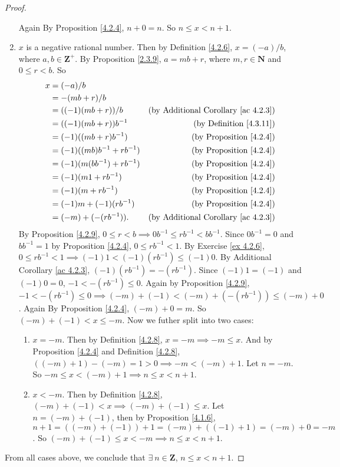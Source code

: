 \begin{proof}
\begin{enumerate}
    Again By Proposition \ref{4.2.4}, \(n + 0 = n\).
    So \(n \leq x < n + 1\).
    \item \(x\) is a negative rational number.
    Then by Definition \ref{4.2.6}, \(x = (-a) / b\), where \(a, b \in \mathbf{Z}^+\).
    By Proposition \ref{2.3.9}, \(a = mb + r\), where \(m, r \in \mathbf{N}\) and \(0 \leq r < b\).
    So
    \begin{align*}
    x &= (-a) / b \\
    &= -(mb + r) / b \\
    &= ((-1)(mb + r)) / b & \text{(by Additional Corollary \ref{ac 4.2.3})} \\
    &= ((-1)(mb + r))b^{-1} & \text{(by Definition \ref{4.3.11})} \\
    &= (-1)((mb + r)b^{-1}) & \text{(by Proposition \ref{4.2.4})} \\
    &= (-1)((mb)b^{-1} + rb^{-1}) & \text{(by Proposition \ref{4.2.4})} \\
    &= (-1)(m(bb^{-1}) + rb^{-1}) & \text{(by Proposition \ref{4.2.4})} \\
    &= (-1)(m1 + rb^{-1}) & \text{(by Proposition \ref{4.2.4})} \\
    &= (-1)(m + rb^{-1}) & \text{(by Proposition \ref{4.2.4})} \\
    &= (-1)m + (-1)(rb^{-1}) & \text{(by Proposition \ref{4.2.4})} \\
    &= (-m) + (-(rb^{-1})). & \text{(by Additional Corollary \ref{ac 4.2.3})} \\
    \end{align*}
    By Proposition \ref{4.2.9}, \(0 \leq r < b \implies 0b^{-1} \leq rb^{-1} < bb^{-1}\).
    Since \(0b^{-1} = 0\) and \(bb^{-1} = 1\) by Proposition \ref{4.2.4}, \(0 \leq rb^{-1} < 1\).
    By Exercise \ref{ex 4.2.6}, \(0 \leq rb^{-1} < 1 \implies (-1)1 < (-1)(rb^{-1}) \leq (-1)0\).
    By Additional Corollary \ref{ac 4.2.3}, \((-1)(rb^{-1}) = -(rb^{-1})\).
    Since \((-1)1 = (-1)\) and \((-1)0 = 0\), \(-1 < -(rb^{-1}) \leq 0\).
    Again by Proposition \ref{4.2.9}, \(-1 < -(rb^{-1}) \leq 0 \implies (-m) + (-1) < (-m) + (-(rb^{-1})) \leq (-m) + 0\).
    Again By Proposition \ref{4.2.4}, \((-m) + 0 = m\).
    So \((-m) + (-1) < x \leq -m\).
    Now we futher split into two cases:
    \begin{enumerate}[label=(\roman*)]
        \item \(x = -m\).
        Then by Definition \ref{4.2.8}, \(x = -m \implies -m \leq x\).
        And by Proposition \ref{4.2.4} and Definition \ref{4.2.8}, \(((-m) + 1) - (-m) = 1 > 0 \implies -m < (-m) + 1\).
        Let \(n = -m\).
        So \(-m \leq x < (-m) + 1 \implies n \leq x < n + 1\).
        \item \(x < -m\).
        Then by Definition \ref{4.2.8}, \((-m) + (-1) < x \implies (-m) + (-1) \leq x\).
        Let \(n = (-m) + (-1)\), then by Proposition \ref{4.1.6}, \(n + 1 = ((-m) + (-1)) + 1 = (-m) + ((-1) + 1) = (-m) + 0 = -m\).
        So \((-m) + (-1) \leq x < -m \implies n \leq x < n + 1\).
    \end{enumerate}
\end{enumerate}
From all cases above, we conclude that \(\exists\ n \in \mathbf{Z}\), \(n \leq x < n + 1\).


\end{proof}
